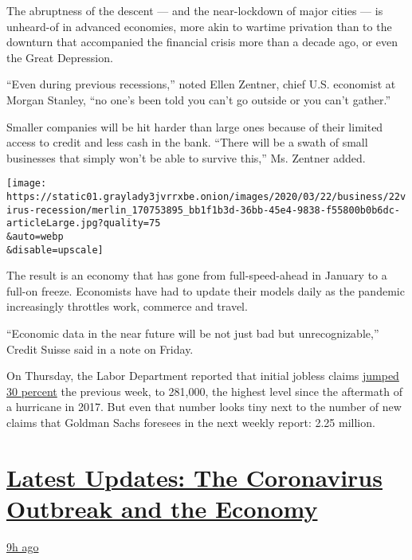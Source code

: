 The abruptness of the descent --- and the near-lockdown of major cities
--- is unheard-of in advanced economies, more akin to wartime privation
than to the downturn that accompanied the financial crisis more than a
decade ago, or even the Great Depression.

``Even during previous recessions,'' noted Ellen Zentner, chief U.S.
economist at Morgan Stanley, ``no one's been told you can't go outside
or you can't gather.''

Smaller companies will be hit harder than large ones because of their
limited access to credit and less cash in the bank. ``There will be a
swath of small businesses that simply won't be able to survive this,''
Ms. Zentner added.

\texttt{[image: https://static01.graylady3jvrrxbe.onion/images/2020/03/22/business/22virus-recession/merlin\_170753895\_bb1f1b3d-36bb-45e4-9838-f55800b0b6dc-articleLarge.jpg?quality=75\\\&auto=webp\\\&disable=upscale]}

The result is an economy that has gone from full-speed-ahead in January
to a full-on freeze. Economists have had to update their models daily as
the pandemic increasingly throttles work, commerce and travel.

``Economic data in the near future will be not just bad but
unrecognizable,'' Credit Suisse said in a note on Friday.

On Thursday, the Labor Department reported that initial jobless claims
\href{https://www.nytimes3xbfgragh.onion/2020/03/19/business/economy/coronavirus-employers-unemployment.html}{jumped
30 percent} the previous week, to 281,000, the highest level since the
aftermath of a hurricane in 2017. But even that number looks tiny next
to the number of new claims that Goldman Sachs foresees in the next
weekly report: 2.25 million.

\hypertarget{latest-updates-the-coronavirus-outbreak-and-the-economy}{%
\section{\texorpdfstring{\href{https://www.nytimes3xbfgragh.onion/live/2020/09/11/business/stock-market-today-coronavirus?action=click\&pgtype=Article\&state=default\&region=MAIN_CONTENT_1\&context=storylines_live_updates}{Latest
Updates: The Coronavirus Outbreak and the
Economy}}{Latest Updates: The Coronavirus Outbreak and the Economy}}\label{latest-updates-the-coronavirus-outbreak-and-the-economy}}

\href{https://www.nytimes3xbfgragh.onion/live/2020/09/11/business/stock-market-today-coronavirus?action=click\&pgtype=Article\&state=default\&region=MAIN_CONTENT_1\&context=storylines_live_updates\#the-nyse-may-move-its-data-center-out-of-new-jersey-in-response-to-a-proposed-tax}{9h
ago}

